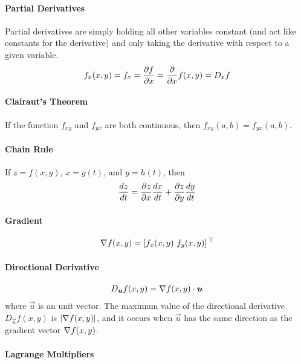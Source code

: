 \paragraph{Partial Derivatives}

Partial derivatives are simply holding all other variables constant (and act like constants for the derivative) and only taking the derivative with respect to a given variable.
\begin{align*}
	f_x(x,y)=f_x=\frac{\partial f}{\partial x}=\frac{\partial}{\partial x}f(x,y)=D_x f
\end{align*}

\paragraph{Clairaut's Theorem}

If the function $f_{xy}$ and $f_{yx}$ are both continuous, then $f_{xy}(a,b)=f_{yx}(a,b)$.

\paragraph{Chain Rule}

If $z=f(x,y)$, $x=g(t)$, and $y=h(t)$, then
\begin{align*}
	\frac{dz}{dt}=\frac{\partial z}{\partial x}\frac{dx}{dt}+\frac{\partial z}{\partial y}\frac{dy}{dt}
\end{align*}

\paragraph{Gradient}

\begin{align*}
	\nabla f(x,y)=\left[f_x(x,y)\ f_y(x,y)\right]{}^\top
\end{align*}

\paragraph{Directional Derivative}

\begin{align*}
	D_{\boldsymbol{u}}f(x,y)=\nabla f(x,y)\cdot\boldsymbol{u}
\end{align*}
where $\vec{u}$ is an unit vector. The maximum value of the directional derivative $D_{\vec{u}}f(x,y)$ is $\left\vert\nabla f(x,y)\right\vert$, and it occurs when $\vec{u}$ has the same direction as the gradient vector $\nabla f(x,y)$.

\paragraph{Lagrange Multipliers}

